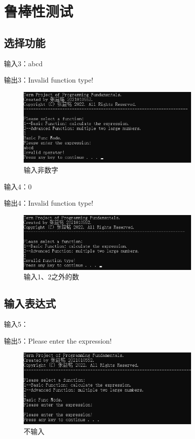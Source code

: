 \documentclass[a4paper, 11pt, UTF8]{ctexart}
\begin{document}
\section{鲁棒性测试}

\subsection{选择功能}

输入3：abcd

输出3：Invalid function type!

\begin{figure}[H]
    \centering
    \caption{输入非数字}
    \includegraphics[width=0.8\textwidth]{t3.png}    
\end{figure}

输入4：0

输出4：Invalid function type!

\begin{figure}[H]
    \centering
    \caption{输入1、2之外的数}
    \includegraphics[width=0.8\textwidth]{t4.png}
\end{figure}

\subsection{输入表达式}

输入5：

输出5：Please enter the expression!

\begin{figure}[H]
    \centering
    \caption{不输入}
    \includegraphics[width=0.8\textwidth]{t5.png}
\end{figure}
\end{document}
